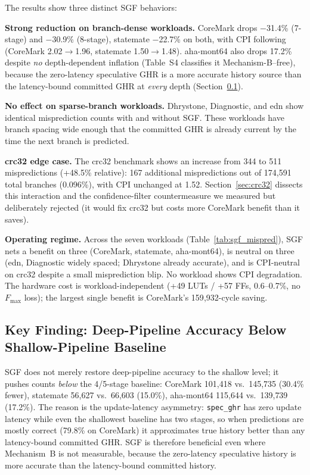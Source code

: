 \documentclass[acmsmall,nonacm,screen]{acmart}
\begin{document}
The results show three distinct SGF behaviors:

\textbf{Strong reduction on branch-dense workloads.}
CoreMark drops $-$31.4\% (7-stage) and $-$30.9\% (8-stage), statemate $-$22.7\% on both, with CPI following (CoreMark 2.02$\to$1.96, statemate 1.50$\to$1.48). aha-mont64 also drops 17.2\% despite \emph{no} depth-dependent inflation (Table~S4 classifies it Mechanism-B--free), because the zero-latency speculative GHR is a more accurate history source than the latency-bound committed GHR at \emph{every} depth (Section~\ref{sec:sgf_key}).

\textbf{No effect on sparse-branch workloads.}
Dhrystone, Diagnostic, and edn show identical misprediction counts with and without SGF.
These workloads have branch spacing wide enough that the committed GHR is already current by the time the next branch is predicted.

\textbf{crc32 edge case.}
The crc32 benchmark shows an increase from 344 to 511 mispredictions (+48.5\% relative): 167 additional mispredictions out of 174{,}591 total branches (0.096\%), with CPI unchanged at 1.52.
Section~\ref{sec:crc32} dissects this interaction and the confidence-filter countermeasure we measured but deliberately rejected (it would fix crc32 but costs more CoreMark benefit than it saves).

\textbf{Operating regime.} Across the seven workloads (Table~\ref{tab:sgf_mispred}), SGF nets a benefit on three (CoreMark, statemate, aha-mont64), is neutral on three (edn, Diagnostic widely spaced; Dhrystone already accurate), and is CPI-neutral on crc32 despite a small misprediction blip. No workload shows CPI degradation. The hardware cost is workload-independent (+49 LUTs / +57 FFs, 0.6--0.7\%, no $F_{\max}$ loss); the largest single benefit is CoreMark's 159{,}932-cycle saving.

\subsection{Key Finding: Deep-Pipeline Accuracy Below Shallow-Pipeline Baseline}
\label{sec:sgf_key}

SGF does not merely restore deep-pipeline accuracy to the shallow level; it pushes counts \emph{below} the 4/5-stage baseline: CoreMark 101{,}418 vs.\ 145{,}735 (30.4\% fewer), statemate 56{,}627 vs.\ 66{,}603 (15.0\%), aha-mont64 115{,}644 vs.\ 139{,}739 (17.2\%). The reason is the update-latency asymmetry: \texttt{spec\_ghr} has zero update latency while even the shallowest baseline has two stages, so when predictions are mostly correct (79.8\% on CoreMark) it approximates true history better than any latency-bound committed GHR. SGF is therefore beneficial even where Mechanism~B is not measurable, because the zero-latency speculative history is more accurate than the latency-bound committed history.
\end{document}
